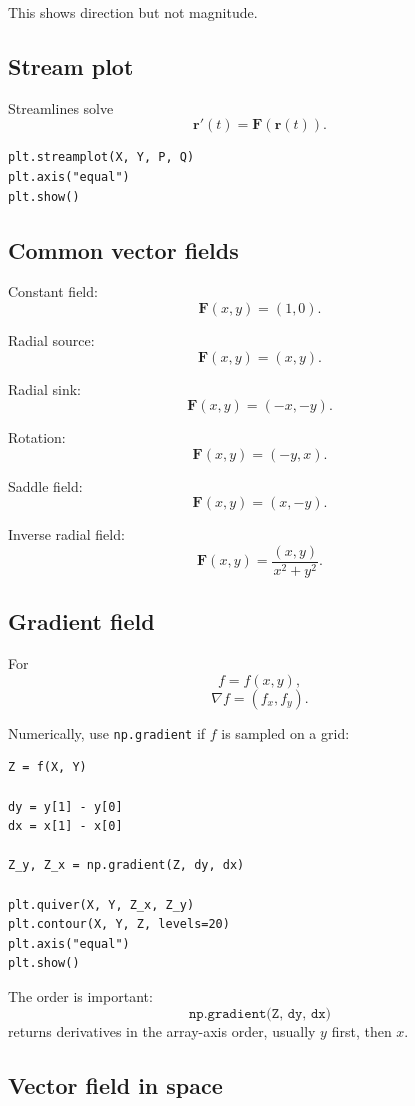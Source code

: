 This shows direction but not magnitude.

\subsection*{Stream plot}

Streamlines solve
\[
\boxed{
    \mathbf r'(t)=\mathbf F(\mathbf r(t)).
}
\]

\begin{verbatim}
plt.streamplot(X, Y, P, Q)
plt.axis("equal")
plt.show()
\end{verbatim}

\subsection*{Common vector fields}

Constant field:
\[
\boxed{
    \mathbf F(x,y)=(1,0).
}
\]

Radial source:
\[
\boxed{
    \mathbf F(x,y)=(x,y).
}
\]

Radial sink:
\[
\boxed{
    \mathbf F(x,y)=(-x,-y).
}
\]

Rotation:
\[
\boxed{
    \mathbf F(x,y)=(-y,x).
}
\]

Saddle field:
\[
\boxed{
    \mathbf F(x,y)=(x,-y).
}
\]

Inverse radial field:
\[
\boxed{
    \mathbf F(x,y)=\frac{(x,y)}{x^2+y^2}.
}
\]

\subsection*{Gradient field}

For
\[
    f=f(x,y),
\]
\[
\boxed{
    \nabla f=(f_x,f_y).
}
\]

Numerically, use \texttt{np.gradient} if \(f\) is sampled on a grid:

\begin{verbatim}
Z = f(X, Y)

dy = y[1] - y[0]
dx = x[1] - x[0]

Z_y, Z_x = np.gradient(Z, dy, dx)

plt.quiver(X, Y, Z_x, Z_y)
plt.contour(X, Y, Z, levels=20)
plt.axis("equal")
plt.show()
\end{verbatim}

The order is important:
\[
\boxed{
    \texttt{np.gradient(Z, dy, dx)}
}
\]
returns derivatives in the array-axis order, usually \(y\) first, then \(x\).

\subsection*{Vector field in space}

